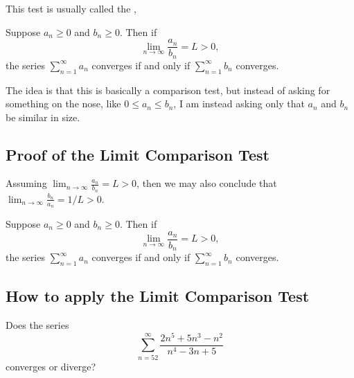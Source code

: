 This test is usually called the ,
\begin{theorem}
  \label{thm:limit-comparison-test}
  Suppose $a_n \geq 0$ and $b_n \geq 0$.  Then if
  $$
  \lim_{n \to \infty} \frac{a_n}{b_n} = L > 0,
  $$
  the series $\sum_{n=1}^\infty a_n$ converges if and only if
  $\sum_{n=1}^\infty b_n$ converges.
\end{theorem}

The idea is that this is basically a comparison test, but instead of
asking for something on the nose, like $0 \leq a_n \leq b_n$, I am
instead asking only that $a_n$ and $b_n$ be similar in size.

\subsection{Proof of the Limit Comparison Test}

Assuming $\lim_{n \to \infty} \frac{a_n}{b_n} = L > 0$, then we may also conclude that $\lim_{n \to \infty} \frac{b_n}{a_n} = 1/L > 0$.

\begin{theorem}
  \label{thm:limit-comparison-test}
  Suppose $a_n \geq 0$ and $b_n \geq 0$.  Then if
  $$
  \lim_{n \to \infty} \frac{a_n}{b_n} = L > 0,
  $$
  the series $\sum_{n=1}^\infty a_n$ converges if and only if
  $\sum_{n=1}^\infty b_n$ converges.
\end{theorem}

\subsection{How to apply the Limit Comparison Test}

\begin{example}
  Does the series
  $$
  \sum_{n=52}^\infty \frac{2n^5 + 5n^3 - n^2}{n^4 - 3n + 5}
  $$ converges or diverge?
\end{example}

